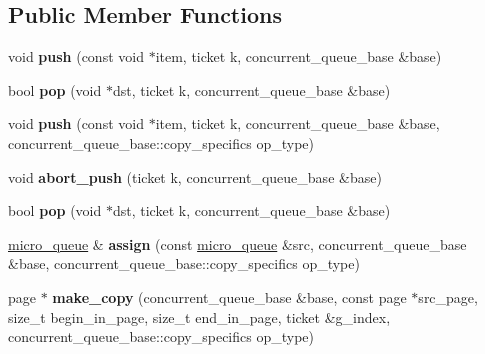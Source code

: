 \subsection*{Public Member Functions}
\begin{DoxyCompactItemize}
\item 
\hypertarget{structtbb_1_1internal_1_1micro__queue_a59ecd3b2aaf7e0f9d6f4847e0db87088}{}void {\bfseries push} (const void $\ast$item, ticket k, concurrent\+\_\+queue\+\_\+base \&base)\label{structtbb_1_1internal_1_1micro__queue_a59ecd3b2aaf7e0f9d6f4847e0db87088}

\item 
\hypertarget{structtbb_1_1internal_1_1micro__queue_acf53d0cdfd439273c8d3d52b860abe3f}{}bool {\bfseries pop} (void $\ast$dst, ticket k, concurrent\+\_\+queue\+\_\+base \&base)\label{structtbb_1_1internal_1_1micro__queue_acf53d0cdfd439273c8d3d52b860abe3f}

\item 
\hypertarget{structtbb_1_1internal_1_1micro__queue_a7fe11e7da2dc9af4a9e37e208c1d0308}{}void {\bfseries push} (const void $\ast$item, ticket k, concurrent\+\_\+queue\+\_\+base \&base, concurrent\+\_\+queue\+\_\+base\+::copy\+\_\+specifics op\+\_\+type)\label{structtbb_1_1internal_1_1micro__queue_a7fe11e7da2dc9af4a9e37e208c1d0308}

\item 
\hypertarget{structtbb_1_1internal_1_1micro__queue_abf8b2f9f05a9152a8c53ec6f9551d0d0}{}void {\bfseries abort\+\_\+push} (ticket k, concurrent\+\_\+queue\+\_\+base \&base)\label{structtbb_1_1internal_1_1micro__queue_abf8b2f9f05a9152a8c53ec6f9551d0d0}

\item 
\hypertarget{structtbb_1_1internal_1_1micro__queue_acf53d0cdfd439273c8d3d52b860abe3f}{}bool {\bfseries pop} (void $\ast$dst, ticket k, concurrent\+\_\+queue\+\_\+base \&base)\label{structtbb_1_1internal_1_1micro__queue_acf53d0cdfd439273c8d3d52b860abe3f}

\item 
\hypertarget{structtbb_1_1internal_1_1micro__queue_a7cce1248bacd9b29b296868bdd6b72dc}{}\hyperlink{structtbb_1_1internal_1_1micro__queue}{micro\+\_\+queue} \& {\bfseries assign} (const \hyperlink{structtbb_1_1internal_1_1micro__queue}{micro\+\_\+queue} \&src, concurrent\+\_\+queue\+\_\+base \&base, concurrent\+\_\+queue\+\_\+base\+::copy\+\_\+specifics op\+\_\+type)\label{structtbb_1_1internal_1_1micro__queue_a7cce1248bacd9b29b296868bdd6b72dc}

\item 
\hypertarget{structtbb_1_1internal_1_1micro__queue_ac452eec7729e4ea11f227ce2f8793179}{}page $\ast$ {\bfseries make\+\_\+copy} (concurrent\+\_\+queue\+\_\+base \&base, const page $\ast$src\+\_\+page, size\+\_\+t begin\+\_\+in\+\_\+page, size\+\_\+t end\+\_\+in\+\_\+page, ticket \&g\+\_\+index, concurrent\+\_\+queue\+\_\+base\+::copy\+\_\+specifics op\+\_\+type)\label{structtbb_1_1internal_1_1micro__queue_ac452eec7729e4ea11f227ce2f8793179}


\end{DoxyCompactItemize}
